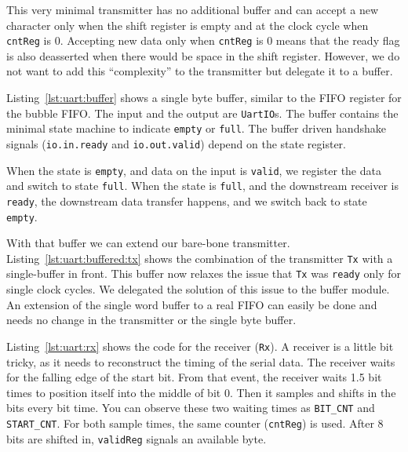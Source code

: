 \documentclass[%
    10pt,
    headinclude, footexclude,
    openright, %
    notitlepage,
    cleardoubleempty,
    headsepline,
    pointlessnumbers,
    bibtotoc, idxtotoc,
    ]{scrbook}
\newcommand{\code}[1]{{\small{\texttt{#1}}}}
\begin{document}
This very minimal transmitter has no additional buffer and can
accept a new character only when the shift register is empty
and at the clock cycle when \code{cntReg} is 0.
Accepting new data only when \code{cntReg} is 0 means
that the ready flag is also deasserted when there would be
space in the shift register. However, we do not want to add this
``complexity'' to the transmitter but delegate it to a buffer.


Listing~\ref{lst:uart:buffer} shows a single byte buffer, similar to
the FIFO register for the bubble FIFO. The input and the output
are \code{UartIO}s.
The buffer contains the minimal state machine
to indicate \code{empty} or \code{full}. The buffer driven handshake
signals (\code{io.in.ready} and \code{io.out.valid}) depend on the state
register.

When the state is \code{empty}, and data on the input is \code{valid},
we register the data and switch to state \code{full}.
When the state is \code{full}, and the downstream receiver is
\code{ready}, the downstream data transfer happens, and we switch
back to state \code{empty}.


With that buffer we can extend our bare-bone transmitter.
Listing~\ref{lst:uart:buffered:tx} shows the combination of the transmitter \code{Tx}
with a single-buffer in front. This buffer now relaxes the issue that \code{Tx}
was \code{ready} only for single clock cycles. We delegated the solution of
this issue to the buffer module.
An extension of the single word buffer to a real FIFO can easily be done
and needs no change in the transmitter or the single byte buffer.


Listing~\ref{lst:uart:rx} shows the code for the receiver (\code{Rx}).
A receiver is a little bit tricky, as it needs to reconstruct the timing of
the serial data. The receiver waits for the falling edge of the start bit.
From that event, the receiver waits 1.5 bit times to position itself into the middle
of bit 0. Then it samples and shifts in the bits every bit time. You can observe these
two waiting times as \code{BIT\_CNT} and \code{START\_CNT}.
For both sample times, the same counter (\code{cntReg}) is used.
After 8 bits are shifted in, \code{validReg} signals an available byte.
\end{document}
